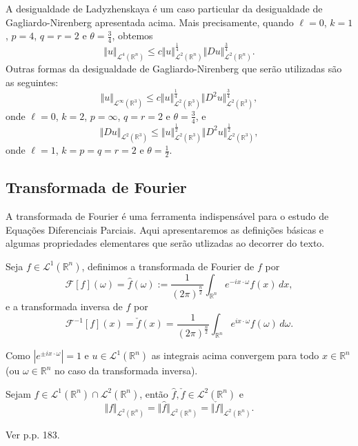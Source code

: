 \documentclass[a4paper, 11pt]{book}
\theoremstyle{definition}
\newcommand{\bR}{\mathbb{R}}
\newcommand{\cF}{\mathcal{F}}
\newcommand{\cL}{\mathcal{L}}
\begin{document}
A desigualdade de Ladyzhenskaya é um caso particular da desigualdade de Gagliardo-Nirenberg apresentada acima. Mais precisamente, quando $\ell = 0$, $k = 1$, $p = 4$, $q = r = 2$ e $\theta = \frac{3}{4}$, obtemos
\begin{equation} \label{eq:gagliardoL4}
    \Vert u \Vert_{\cL^4(\bR^n)} \leqslant c \Vert u \Vert_{\cL^2(\bR^n)}^{\frac{1}{4}} \Vert Du \Vert_{\cL^2(\bR^n)}^{\frac{3}{4}}.
\end{equation}
Outras formas da desigualdade de Gagliardo-Nirenberg que serão utilizadas são as seguintes:
\begin{equation} \label{eq:gagliardoinf}
    \Vert u \Vert_{\cL^\infty(\bR^3)} \leqslant c \Vert u \Vert_{\cL^2(\bR^3)}^{\frac{1}{4}} \Vert D^2 u \Vert_{\cL^2(\bR^3)}^{\frac{3}{4}},
\end{equation}
onde $\ell = 0$, $k = 2$, $p = \infty$, $q = r = 2$ e $\theta = \frac{3}{4}$, e
\begin{equation} \label{eq:gagliardoDu}
    \Vert Du \Vert_{\cL^2(\bR^3)} \leqslant \Vert u \Vert_{\cL^2(\bR^3)}^{\frac{1}{2}} \Vert D^2 u \Vert_{\cL^2(\bR^3)}^{\frac{1}{2}},
\end{equation}
onde $\ell = 1$, $k = p = q = r = 2$ e $\theta = \frac{1}{2}$.

\subsection{Transformada de Fourier}

A transformada de Fourier é uma ferramenta indispensável para o estudo de Equações Diferenciais Parciais. Aqui apresentaremos as definições básicas e algumas propriedades elementares que serão utlizadas ao decorrer do texto.

\begin{dbox}
    Seja $f \in \cL^1(\bR^n)$, definimos a transformada de Fourier de $f$ por
    \[
        \cF[f](\omega) = \hat f(\omega) := \frac{1}{(2\pi)^{\frac{n}{2}}} \int_{\bR^n} e^{-i x \cdot \omega} f(x) \,dx,
    \]
    e a transformada inversa de $f$ por
    \[
        \cF^{-1}[f](x) =  \check f(x) = \frac{1}{(2\pi)^{\frac{n}{2}}} \int_{\bR^n} e^{i x \cdot \omega} f(\omega) \,d\omega.
    \]
\end{dbox}

Como $|e^{\pm ix \cdot \omega}| = 1$ e $u \in \cL^1(\bR^n)$ as integrais acima convergem para todo $x \in \bR^n$ (ou $\omega \in \bR^n$ no caso da transformada inversa).

\begin{tbox} \label{thm:norma-transformada}
    Sejam $f \in \cL^1(\bR^n) \cap \cL^2(\bR^n)$, então $\hat f, \check f \in \cL^2(\bR^n)$ e
    \[
        \Vert f \Vert_{\cL^2(\bR^n)} = \Vert \hat f \Vert_{\cL^2(\bR^n)} = \Vert \check f \Vert_{\cL^2(\bR^n)}.
    \]
\end{tbox}
\begin{prf}
    Ver \cite{evans-pde} p.p. 183.
\end{prf}
\end{document}

